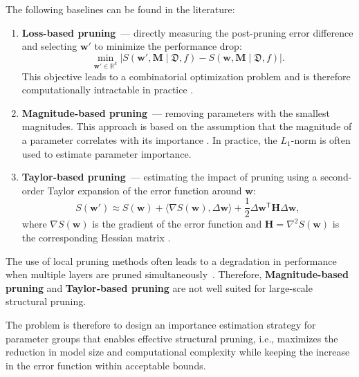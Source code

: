 The following baselines can be found in the literature:
\begin{enumerate}
    \item \textbf{Loss-based pruning}~--- directly measuring the post-pruning error difference and selecting $\mathbf{w}'$ to minimize the performance drop:
    \begin{equation}
    \label{eq:loss_pruning}
    \min_{\mathbf{w}' \in \mathbb{R}^k}
    \left|
    S(\mathbf{w}', \mathbf{M} \mid \mathfrak{D}, f)
    -
    S(\mathbf{w}, \mathbf{M} \mid \mathfrak{D}, f)
    \right|.
    \end{equation}
    This objective leads to a combinatorial optimization problem and is therefore computationally intractable in practice \cite{Molchanov2019}.

    \item \textbf{Magnitude-based pruning}~--- removing parameters with the smallest magnitudes. This approach is based on the assumption that the magnitude of a parameter correlates with its importance \cite{Han2015}. In practice, the $L_1$-norm is often used to estimate parameter importance.
    
    \item \textbf{Taylor-based pruning}~--- estimating the impact of pruning using a second-order Taylor expansion of the error function around $\mathbf{w}$:
    \begin{equation}
    S(\mathbf{w}')
    \approx
    S(\mathbf{w})
    +
    \langle \nabla S(\mathbf{w}), \Delta \mathbf{w} \rangle
    +
    \frac{1}{2}
    \Delta \mathbf{w}^{\mathsf{T}}
    \mathbf{H}
    \Delta \mathbf{w},
    \end{equation}
    where $\nabla S(\mathbf{w})$ is the gradient of the error function and $\mathbf{H} = \nabla^2 S(\mathbf{w})$ is the corresponding Hessian matrix \cite{Molchanov2019}.
\end{enumerate}

The use of local pruning methods often leads to a degradation in performance when multiple layers are pruned simultaneously~\cite{You2019}. Therefore, \textbf{Magnitude-based pruning} and \textbf{Taylor-based pruning} are not well suited for large-scale structural pruning.

The problem is therefore to design an importance estimation strategy for parameter groups that enables effective structural pruning, i.e., maximizes the reduction in model size and computational complexity while keeping the increase in the error function within acceptable bounds.
